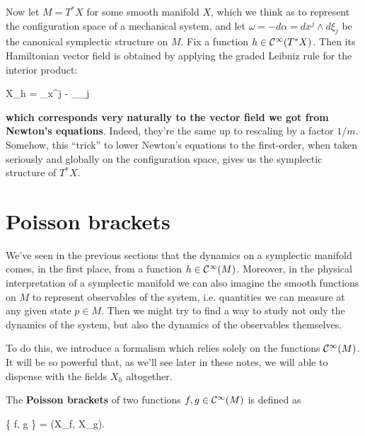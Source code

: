 \documentclass[main.tex]{subfiles}
\begin{document}
Now let $M=T^*X$ for some smooth manifold $X$, which we think as to represent the configuration space of a mechanical system, and let $\omega = -d\alpha = dx^j \wedge d\xi_j$ be the canonical symplectic structure on $M$. Fix a function $h \in \mathcal{C}^\infty(T^*X)$. Then its Hamiltonian vector field is obtained by applying the graded Leibniz rule for the interior product\footnotemark:
\begin{eqalign}
	X_h =  \partial_{x^j} - \partial_{\xi_j}
\end{eqalign}
\textbf{which corresponds very naturally to the vector field we got from Newton's equations}. Indeed, they're the same up to rescaling by a factor $1/m$. Somehow, this ``trick'' to lower Newton's equations to the first-order, when taken seriously and globally on the configuration space, gives us the symplectic structure of $T^* X$.

\section{Poisson brackets}
We've seen in the previous sections that the dynamics on a symplectic manifold comes, in the first place, from a function $h \in \mathcal{C}^\infty(M)$. Moreover, in the physical interpretation of a symplectic manifold we can also imagine the smooth functions on $M$ to represent observables of the system, i.e. quantities we can measure at any given state $p \in M$. Then we might try to find a way to study not only the dynamics of the system, but also the dynamics of the observables themselves.

To do this, we introduce a formalism which relies solely on the functions $\mathcal{C}^\infty(M)$. It will be so powerful that, as we'll see later in these notes, we will able to dispense with the fields $X_h$ altogether.

\begin{definition}
	The \textbf{Poisson brackets} of two functions $f,g \in \mathcal{C}^\infty(M)$ is defined as
	\begin{eqalign}
		\{ f, g \} = \omega(X_f, X_g).
	\end{eqalign}
\end{definition}
\end{document}
